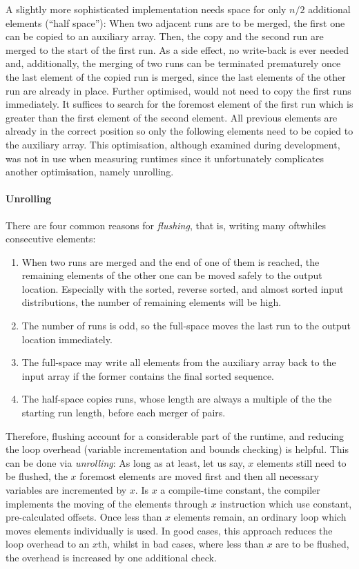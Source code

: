 A slightly more sophisticated implementation needs space for only \(n/2\) additional elements (\enquote{half space}):
When two adjacent runs are to be merged, the first one can be copied to an auxiliary array.
Then, the copy and the second run are merged to the start of the first run.
As a side effect, no write-back is ever needed and, additionally, the merging of two runs can be terminated prematurely once the last element of the copied run is merged, since the last elements of the other run are already in place.
Further optimised, \MS{} would not need to copy the first runs immediately.
It suffices to search for the foremost element of the first run which is greater than the first element of the second element.
All previous elements are already in the correct position so only the following elements need to be copied to the auxiliary array.
This optimisation, although examined during development, was not in use when measuring runtimes since it unfortunately complicates another optimisation, namely unrolling.

\paragraph{Unrolling}
There are four common reasons for \emph{flushing}, that is, writing \Dash many oftwhiles \Dash consecutive elements:
\begin{enumerate}
	\item
	When two runs are merged and the end of one of them is reached, the remaining elements of the other one can be moved safely to the output location.
	Especially with the sorted, reverse sorted, and almost sorted input distributions, the number of remaining elements will be high.

	\item
	The number of runs is odd, so the full-space \MS{} moves the last run to the output location immediately.

	\item
	The full-space \MS{} may write all elements from the auxiliary array back to the input array if the former contains the final sorted sequence.

	\item
	The half-space \MS{} copies runs, whose length are always a multiple of the the starting run length, before each merger of pairs.
\end{enumerate}
Therefore, flushing account for a considerable part of the runtime, and reducing the loop overhead (variable incrementation and bounds checking) is helpful.
This can be done via \emph{unrolling}:
As long as at least, let us say, \(x\) elements still need to be flushed, the \(x\) foremost elements are moved first and then all necessary variables are incremented by \(x\).
Is \(x\) a compile-time constant, the compiler implements the moving of the elements through \(x\) instruction which use constant, pre-calculated offsets.
Once less than \(x\) elements remain, an ordinary loop which moves elements individually is used.
In good cases, this approach reduces the loop overhead to an \(x\)th, whilst in bad cases, where less than \(x\) are to be flushed, the overhead is increased by one additional check.

